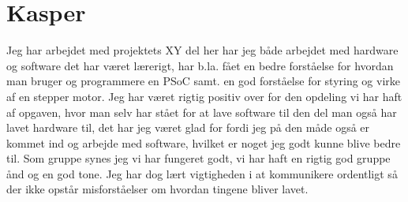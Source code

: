 \section{Kasper}

Jeg har arbejdet med projektets XY del her har jeg både arbejdet med hardware og software det har været lærerigt, har b.la. fået en bedre forståelse for hvordan man bruger og programmere en PSoC samt. en god forståelse for styring og virke af en stepper motor. Jeg har været rigtig positiv over for den opdeling vi har haft af opgaven, hvor man selv har stået for at lave software til den del man også har lavet hardware til, det har jeg været glad for fordi jeg på den måde også er kommet ind og arbejde med software, hvilket er noget jeg godt kunne blive bedre til. Som gruppe synes jeg vi har fungeret godt, vi har haft en rigtig god gruppe ånd og en god tone. Jeg har dog lært vigtigheden i at kommunikere ordentligt så der ikke opstår misforståelser om hvordan tingene bliver lavet. 